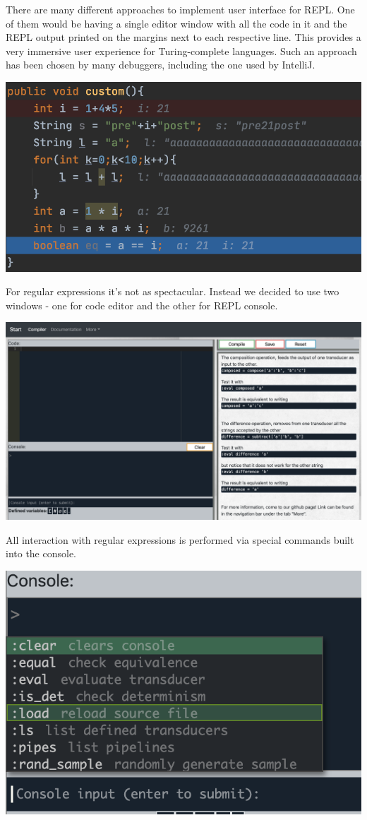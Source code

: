 There are many different approaches to implement user interface for REPL.
One of them would be having a single editor window with all the code in it and the REPL output printed on the margins next to each respective line. This provides a very immersive user experience for Turing-complete languages. Such an approach has been chosen by many debuggers, including the one used by IntelliJ.
\begin{center}
	\includegraphics[scale=0.85]{java_repl.png}
\end{center}
 For regular expressions it's not as spectacular. Instead we decided to use two windows - one for code editor and the other for REPL console. 
 \begin{center}
 	\includegraphics[scale=0.3]{web8.png}
 \end{center}
All interaction with regular expressions is performed via special commands built into the console. 
 \begin{center}
	\includegraphics[scale=1.13]{commands.png}
\end{center}
